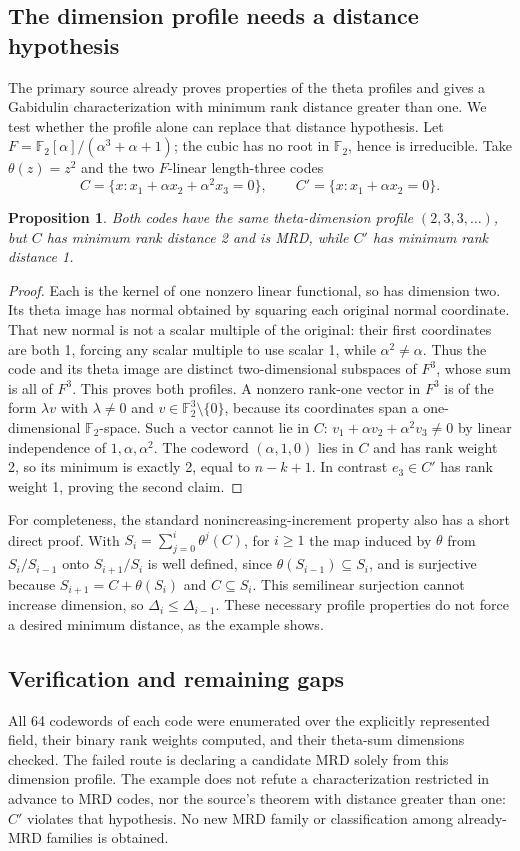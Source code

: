 \documentclass[11pt]{article}
\newtheorem{proposition}{Proposition}
\begin{document}
\subsection{The dimension profile needs a distance hypothesis}
The primary source already proves properties of the theta profiles and gives a Gabidulin characterization with minimum rank distance greater than one. We test whether the profile alone can replace that distance hypothesis. Let $F=\mathbb F_2[\alpha]/(\alpha^3+\alpha+1)$; the cubic has no root in $\mathbb F_2$, hence is irreducible. Take $\theta(z)=z^2$ and the two $F$-linear length-three codes
\[
C=\{x:x_1+\alpha x_2+\alpha^2x_3=0\},\qquad
C'=\{x:x_1+\alpha x_2=0\}.
\]
\begin{proposition}
Both codes have the same theta-dimension profile $(2,3,3,\ldots)$, but $C$ has minimum rank distance 2 and is MRD, while $C'$ has minimum rank distance 1.
\end{proposition}
\begin{proof}
Each is the kernel of one nonzero linear functional, so has dimension two. Its theta image has normal obtained by squaring each original normal coordinate. That new normal is not a scalar multiple of the original: their first coordinates are both 1, forcing any scalar multiple to use scalar 1, while $\alpha^2\ne\alpha$. Thus the code and its theta image are distinct two-dimensional subspaces of $F^3$, whose sum is all of $F^3$. This proves both profiles.
A nonzero rank-one vector in $F^3$ is of the form $\lambda v$ with $\lambda\ne0$ and $v\in\mathbb F_2^3\setminus\{0\}$, because its coordinates span a one-dimensional $\mathbb F_2$-space. Such a vector cannot lie in $C$: $v_1+\alpha v_2+\alpha^2v_3\ne0$ by linear independence of $1,\alpha,\alpha^2$. The codeword $(\alpha,1,0)$ lies in $C$ and has rank weight 2, so its minimum is exactly 2, equal to $n-k+1$. In contrast $e_3\in C'$ has rank weight 1, proving the second claim.
\end{proof}
For completeness, the standard nonincreasing-increment property also has a short direct proof. With $S_i=\sum_{j=0}^i\theta^j(C)$, for $i\ge1$ the map induced by $\theta$ from $S_i/S_{i-1}$ onto $S_{i+1}/S_i$ is well defined, since $\theta(S_{i-1})\subseteq S_i$, and is surjective because $S_{i+1}=C+\theta(S_i)$ and $C\subseteq S_i$. This semilinear surjection cannot increase dimension, so $\Delta_i\le\Delta_{i-1}$. These necessary profile properties do not force a desired minimum distance, as the example shows.
\subsection{Verification and remaining gaps}
All 64 codewords of each code were enumerated over the explicitly represented field, their binary rank weights computed, and their theta-sum dimensions checked. The failed route is declaring a candidate MRD solely from this dimension profile. The example does not refute a characterization restricted in advance to MRD codes, nor the source's theorem with distance greater than one: $C'$ violates that hypothesis. No new MRD family or classification among already-MRD families is obtained.
\end{document}
